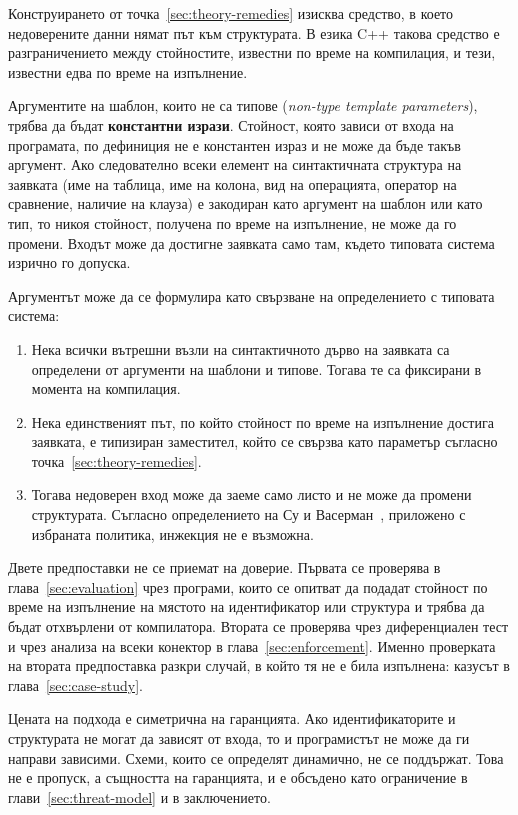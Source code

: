 Конструирането от точка~\ref{sec:theory-remedies} изисква средство, в което
недоверените данни нямат път към структурата. В езика C++ такова средство е
разграничението между стойностите, известни по време на компилация, и тези,
известни едва по време на изпълнение.

Аргументите на шаблон, които не са типове (\textit{non-type template
parameters}), трябва да бъдат \textbf{константни изрази}. Стойност, която
зависи от входа на програмата, по дефиниция не е константен израз и не може да
бъде такъв аргумент. Ако следователно всеки елемент на синтактичната структура
на заявката (име на таблица, име на колона, вид на операцията, оператор на
сравнение, наличие на клауза) е закодиран като аргумент на шаблон или като тип,
то никоя стойност, получена по време на изпълнение, не може да го промени. Входът
може да достигне заявката само там, където типовата система изрично го допуска.

Аргументът може да се формулира като свързване на определението с типовата
система:

\begin{enumerate}
    \item Нека всички вътрешни възли на синтактичното дърво на заявката са
          определени от аргументи на шаблони и типове. Тогава те са фиксирани в
          момента на компилация.
    \item Нека единственият път, по който стойност по време на изпълнение достига
          заявката, е типизиран заместител, който се свързва като параметър
          съгласно точка~\ref{sec:theory-remedies}.
    \item Тогава недоверен вход може да заеме само листо и не може да промени
          структурата. Съгласно определението на Су и
          Васерман~\cite{su2006essence}, приложено с избраната политика,
          инжекция не е възможна.
\end{enumerate}

Двете предпоставки не се приемат на доверие. Първата се проверява в
глава~\ref{sec:evaluation} чрез програми, които се опитват да подадат стойност по
време на изпълнение на мястото на идентификатор или структура и трябва да бъдат
отхвърлени от компилатора. Втората се проверява чрез диференциален тест и чрез
анализа на всеки конектор в глава~\ref{sec:enforcement}. Именно проверката на
втората предпоставка разкри случай, в който тя не е била изпълнена: казусът в
глава~\ref{sec:case-study}.

Цената на подхода е симетрична на гаранцията. Ако идентификаторите и структурата
не могат да зависят от входа, то и програмистът не може да ги направи зависими.
Схеми, които се определят динамично, не се поддържат. Това не е пропуск, а
същността на гаранцията, и е обсъдено като ограничение в
глави~\ref{sec:threat-model} и в заключението.
